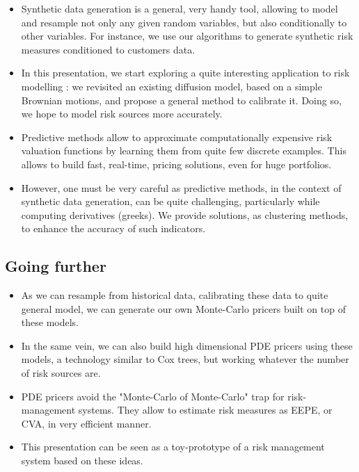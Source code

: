 \documentclass[
]{article}
\numberwithin{equation}{section}
\begin{document}
\begin{itemize}
\item Synthetic data generation is a general, very handy tool, allowing to model and resample not only any given random variables, but also conditionally to other variables. For instance, we use our algorithms to generate synthetic risk measures conditioned to customers data.

\item In this presentation, we start exploring a quite interesting application to risk modelling : we revisited an existing diffusion model, based on a simple Brownian motions, and propose a general method to calibrate it. Doing so, we hope to model risk sources more accurately.

\item Predictive methods allow to approximate computationally expensive risk valuation functions by learning them from quite few discrete examples. This allows to build fast, real-time, pricing solutions, even for huge portfolios.

\item However, one must be very careful as predictive methods, in the context of synthetic data generation, can be quite challenging, particularly while computing derivatives (greeks). We provide solutions, as clustering methods, to enhance the accuracy of such indicators.


\end{itemize}

\hypertarget{going-further}{%
\subsection{Going further}\label{going-further}}

\begin{itemize}

\item As we can resample from historical data, calibrating  these data to quite general model, we can generate our own Monte-Carlo pricers built on top of these models.


\item In the same vein, we can also build high dimensional PDE pricers using these models, a technology similar to Cox trees, but working whatever the number of risk sources are.

\item PDE pricers avoid the "Monte-Carlo of Monte-Carlo" trap for risk-management systems. They allow to estimate risk measures as EEPE, or CVA, in very efficient manner.

\item This presentation can be seen as a toy-prototype of a risk management system based on these ideas.

\end{itemize}
\end{document}

